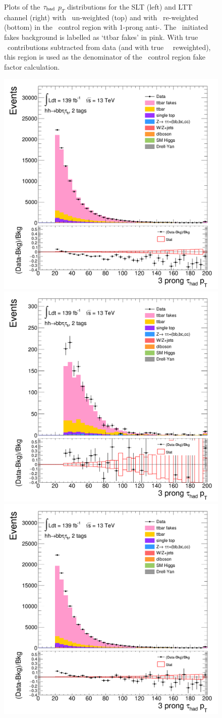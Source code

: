 \begin{figure}
\caption{Plots of the $\tau_{\mathrm{had}}$ $p_T$ distributions for the SLT (left) and LTT channel (right) with \ttbar\ un-weighted (top)
and with \ttbar\ re-weighted (bottom) in the \ttbar\ control region with 1-prong anti-\tauhad. 
The \ttbar\ initiated fakes background is labelled as `ttbar fakes' in pink.
With true \tauhad\ contributions subtracted from data (and with true \tauhad\ \ttbar\ reweighted),  
this region is used as the denominator of the \ttbar\ control region fake factor calculation.}
\label{fig:ttbarCR_1}
\end{figure} 
\begin{figure}
\centering
\includegraphics[width=.45\textwidth]{DiHiggs/plots/FF_CRs/ttbarCR_SLT/HNone/BDTVarsHighMbb/2/C_2tag2pjet_0ptv_TauPt3P.png}
\includegraphics[width=.45\textwidth]{DiHiggs/plots/FF_CRs/ttbarCR_LTT/HNone/BDTVarsHighMbb/2/C_2tag2pjet_0ptv_TauPt3P.png}\\
\includegraphics[width=.45\textwidth]{DiHiggs/plots/FF_CRs/ttbarCR_SLT_weighted/HNone/BDTVarsHighMbb/2/C_2tag2pjet_0ptv_TauPt3P.png}

\end{figure}

